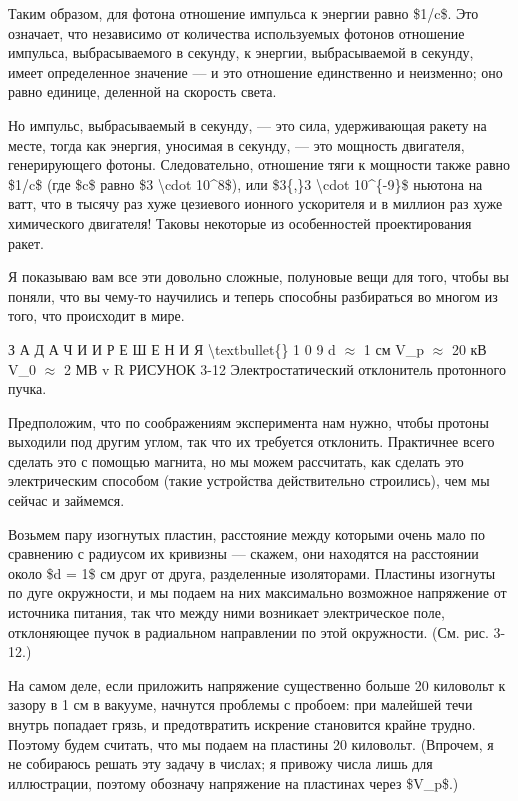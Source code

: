 \documentclass[10pt,oneside]{article}
\begin{document}
Таким образом, для фотона отношение импульса к энергии равно \$1/c\$. Это означает, что независимо от количества используемых фотонов отношение импульса, выбрасываемого в секунду, к энергии, выбрасываемой в секунду, имеет определенное значение --- и это отношение единственно и неизменно; оно равно единице, деленной на скорость света.\par

Но импульс, выбрасываемый в секунду, --- это сила, удерживающая ракету на месте, тогда как энергия, уносимая в секунду, --- это мощность двигателя, генерирующего фотоны. Следовательно, отношение тяги к мощности также равно \$1/c\$ (где \$c\$ равно \$3 \textbackslash{}cdot 10\textasciicircum{}8\$), или \$3\{,\}3 \textbackslash{}cdot 10\textasciicircum{}\{-9\}\$ ньютона на ватт, что в тысячу раз хуже цезиевого ионного ускорителя и в миллион раз хуже химического двигателя! Таковы некоторые из особенностей проектирования ракет.\par

Я показываю вам все эти довольно сложные, полуновые вещи для того, чтобы вы поняли, что вы чему-то научились и теперь способны разбираться во многом из того, что происходит в мире.\par

З А Д А Ч И  И  Р Е Ш Е Н И Я \textbackslash{}textbullet\{\} 1 0 9 d \ensuremath{\approx} 1 см V\_p \ensuremath{\approx} 20 кВ V\_0 \ensuremath{\approx} 2 МВ v R РИСУНОК 3-12 Электростатический отклонитель протонного пучка.\par

Предположим, что по соображениям эксперимента нам нужно, чтобы протоны выходили под другим углом, так что их требуется отклонить. Практичнее всего сделать это с помощью магнита, но мы можем рассчитать, как сделать это электрическим способом (такие устройства действительно строились), чем мы сейчас и займемся.\par

Возьмем пару изогнутых пластин, расстояние между которыми очень мало по сравнению с радиусом их кривизны --- скажем, они находятся на расстоянии около \$d = 1\$ см друг от друга, разделенные изоляторами. Пластины изогнуты по дуге окружности, и мы подаем на них максимально возможное напряжение от источника питания, так что между ними возникает электрическое поле, отклоняющее пучок в радиальном направлении по этой окружности. (См. рис. 3-12.)\par

На самом деле, если приложить напряжение существенно больше 20 киловольт к зазору в 1 см в вакууме, начнутся проблемы с пробоем: при малейшей течи внутрь попадает грязь, и предотвратить искрение становится крайне трудно. Поэтому будем считать, что мы подаем на пластины 20 киловольт. (Впрочем, я не собираюсь решать эту задачу в числах; я привожу числа лишь для иллюстрации, поэтому обозначу напряжение на пластинах через \$V\_p\$.)\par
\end{document}
